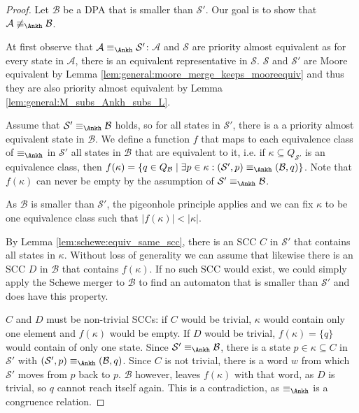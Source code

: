 \begin{proof}
	Let $\mathcal{B}$ be a DPA that is smaller than $\mathcal{S}'$. Our goal is to show that $\mathcal{A} \not\equiv_\text{\Ankh} \mathcal{B}$.
	
	At first observe that $\mathcal{A} \equiv_\text{\Ankh} \mathcal{S}'$: $\mathcal{A}$ and $\mathcal{S}$ are priority almost equivalent as for every state in $\mathcal{A}$, there is an equivalent representative in $\mathcal{S}$. $\mathcal{S}$ and $\mathcal{S}'$ are Moore equivalent by Lemma \ref{lem:general:moore_merge_keeps_mooreequiv} and thus they are also priority almost equivalent by Lemma \ref{lem:general:M_subs_Ankh_subs_L}.

	Assume that $\mathcal{S}' \equiv_\text{\Ankh} \mathcal{B}$ holds, so for all states in $\mathcal{S}'$, there is a a priority almost equivalent state in $\mathcal{B}$. We define a function $f$ that maps to each equivalence class of $\equiv_\text{\Ankh}$ in $\mathcal{S}'$ all states in $\mathcal{B}$ that are equivalent to it, i.e. if $\kappa \subseteq Q_{\mathcal{S}'}$ is an equivalence class, then $f(\kappa) = \{q \in Q_\mathcal{B} \mid \exists p \in \kappa: (\mathcal{S}', p) \equiv_\text{\Ankh} (\mathcal{B}, q) \}$. Note that $f(\kappa)$ can never be empty by the assumption of $\mathcal{S}' \equiv_\text{\Ankh} \mathcal{B}$.
	
	As $\mathcal{B}$ is smaller than $\mathcal{S}'$, the pigeonhole principle applies and we can fix $\kappa$ to be one equivalence class such that $|f(\kappa)| < |\kappa|$.
	
	By Lemma \ref{lem:schewe:equiv_same_scc}, there is an SCC $C$ in $\mathcal{S}'$ that contains all states in $\kappa$. Without loss of generality we can assume that likewise there is an SCC $D$ in $\mathcal{B}$ that contains $f(\kappa)$. If no such SCC would exist, we could simply apply the Schewe merger to $\mathcal{B}$ to find an automaton that is smaller than $\mathcal{S}'$ and does have this property.
	
	$C$ and $D$ must be non-trivial SCCs: if $C$ would be trivial, $\kappa$ would contain only one element and $f(\kappa)$ would be empty. If $D$ would be trivial, $f(\kappa) = \{q\}$ would contain of only one state. Since $\mathcal{S}' \equiv_\text{\Ankh} \mathcal{B}$, there is a state $p \in \kappa \subseteq C$ in $\mathcal{S}'$ with $(\mathcal{S}', p) \equiv_\text{\Ankh} (\mathcal{B}, q)$. Since $C$ is not trivial, there is a word $w$ from which $\mathcal{S}'$ moves from $p$ back to $p$. $\mathcal{B}$ however, leaves $f(\kappa)$ with that word, as $D$ is trivial, so $q$ cannot reach itself again. This is a contradiction, as $\equiv_\text{\Ankh}$ is a congruence relation.
	

\end{proof}
